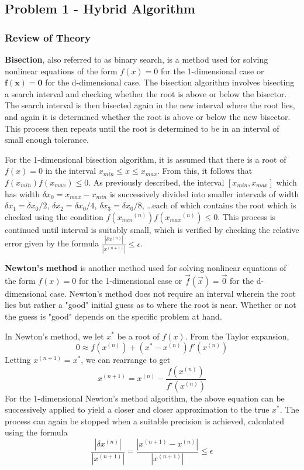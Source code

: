 \documentclass[10pt]{article}
\begin{document}
\subsection*{Problem 1 - Hybrid Algorithm}

\subsubsection*{Review of Theory}

\textbf{Bisection}, also referred to as binary search, is a method used for solving nonlinear equations of the 
form $f(x)=0$ for the 1-dimensional case or $\mathbf{f}(\mathbf{x})=\mathbf{0}$ for the d-dimensional case. The
bisection algorithm involves bisecting a search interval and checking whether the root is above or 
below the bisector. The search interval is then bisected again in the new interval where the root lies, 
and again it is determined whether the root is above or below the new bisector. This process then repeats
until the root is determined to be in an interval of small enough tolerance. 

For the 1-dimensional bisection algorithm, it is assumed that there is a root of $f(x)=0$ in the interval
$x_{min} \leq x \leq x_{max}$. From this, it follows that $f(x_{min})f(x_{max}) \leq 0$. As previously 
described, the interval $[x_{min}, x_{max}]$ which has width $\delta x_0 = x_{max} - x_{min}$ is
successively divided into smaller intervals of width $\delta x_1 = \delta x_0/2$, 
$\delta x_2 = \delta x_0/4$, $\delta x_3 = \delta x_0/8$, \ldots each of which contains the root which is 
checked using the condition $f({x_{min}}^{(n)})f({x_{max}}^{(n)}) \leq 0$. This process is continued until 
interval is suitably small, which is verified by checking the relative error given by the formula
$\frac{| \delta x^{(n)} |}{| x^{(n+1)} |} \leq \epsilon$.

\textbf{Newton's method} is another method used for solving nonlinear equations of the form $f(x)=0$ for the 
1-dimensional case or $\vec{f}(\vec{x})=\vec{0}$ for the d-dimensional case. Newton's method does not 
require an interval wherein the root lies but rather a "good" initial guess as to where the root is near.
Whether or not the guess is "good" depends on the specific problem at hand.

In Newton's method, we let $x^*$ be a root of $f(x)$. From the Taylor expansion,
$$0 \approx f(x^{(n)}) + (x^* - x^{(n)})f'(x^{(n)})$$
Letting $x^{(n+1)} = x^*$, we can rearrange to get
$$x^{(n+1)} = x^{(n)} - \frac{f(x^{(n)})}{f'(x^{(n)})}$$
For the 1-dimensional Newton's method algorithm, the above equation can be successively applied to yield a 
closer and closer approximation to the true $x^*$. The process can again be stopped when a suitable precision
is achieved, calculated using the formula 
$$\frac{| \delta x^{(n)} |}{| x^{(n+1)} |} = \frac{| x^{(n+1)}-x^{(n)} |}{| x^{(n+1)} |} \leq \epsilon$$
\end{document}
